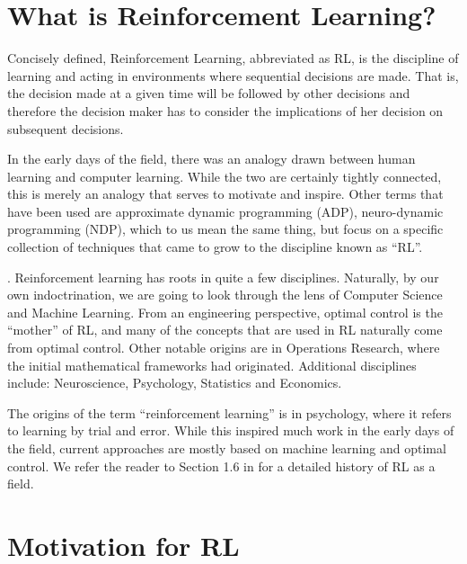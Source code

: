\section{What is Reinforcement Learning?}

Concisely defined, Reinforcement Learning, abbreviated as RL, is the discipline of learning and acting in 
environments where sequential decisions are made. That is, the decision made at a given time 
will be followed by other decisions and therefore the decision maker has to consider the implications 
of her decision on subsequent decisions. 



In the early days of the field, there was an analogy drawn between human learning and computer 
learning. While the two are certainly tightly connected, this is merely an analogy that serves to motivate and inspire. Other terms that 
have been used are approximate dynamic programming (ADP), neuro-dynamic programming (NDP), which to us
mean the same thing, but focus on a specific collection of techniques that came to grow to the discipline known as ``RL''.

 \medskip
{}.
%
Reinforcement learning has roots in quite a few disciplines.
Naturally, by our own indoctrination, we are going to look through the lens of Computer Science
and Machine Learning. From an engineering perspective, optimal control is 
the ``mother'' of RL, and many of the concepts that are used in RL naturally come from optimal control. 
Other notable origins are in Operations Research, where the initial mathematical frameworks had originated.
Additional disciplines include: Neuroscience, Psychology, Statistics and
Economics.

The origins of the term ``reinforcement learning'' is in psychology, where it refers to learning by trial and error. 
While this inspired much work in the early days of the field, current approaches are mostly based on
machine learning and optimal control. We refer the reader to Section 1.6 in \cite{SuttonB98} for 
a detailed history of RL as a field. 

\section{Motivation for RL}

